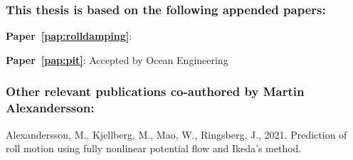 

\subsubsection*{This thesis is based on the following appended papers:}

\noindent\begin{minipage}[adjusting]{\linewidth}
\textbf{Paper~\ref{pap:rolldamping}}: 
\end{minipage}
\vspace{0.25cm}
\newline
\noindent\begin{minipage}[adjusting]{\linewidth}
\textbf{Paper~\ref{pap:pit}}: 
Accepted by Ocean Engineering
\end{minipage}

\subsubsection*{Other relevant publications co-authored by Martin Alexandersson:} 
\normalsize
\newcommand{\ME}{{\bfseries Martin Alexandersson}}

\noindent\begin{minipage}[adjusting]{\linewidth}
\end{minipage}
\vspace{0.25cm}
\newline
\noindent\begin{minipage}[adjusting]{\linewidth}
Alexandersson, M., Kjellberg, M., Mao, W., Ringsberg, J., 2021. Prediction of roll motion using fully nonlinear potential flow and Ikeda’s method.
\end{minipage}


